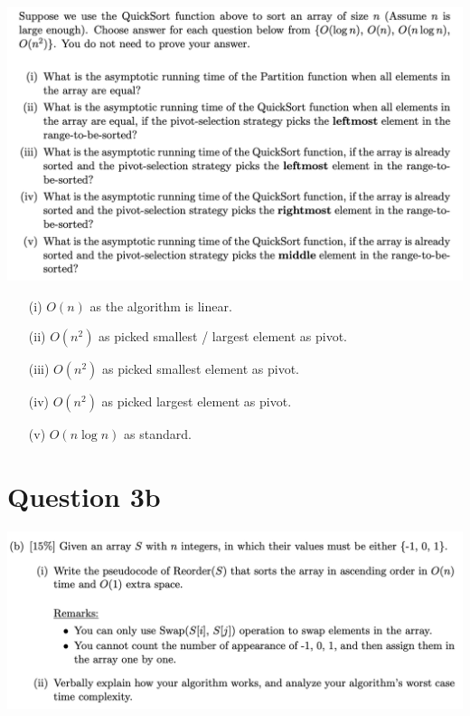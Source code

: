 \documentclass{article}
\begin{document}
\begin{center}
    \includegraphics[width=\linewidth]{img/3a.png}
\end{center}

\begin{enumerate}
    \item[(i)] $O(n)$ as the algorithm is linear.
    \item[(ii)] $O(n^2)$ as picked smallest / largest element as pivot.
    \item[(iii)] $O(n^2)$ as picked smallest element as pivot.
    \item[(iv)] $O(n^2)$ as picked largest element as pivot.
    \item[(v)] $O(n \log n)$ as standard.
\end{enumerate}

\section*{Question 3b}

\begin{center}
    \includegraphics[width=\linewidth]{img/3b.png}
\end{center}


\end{document}
